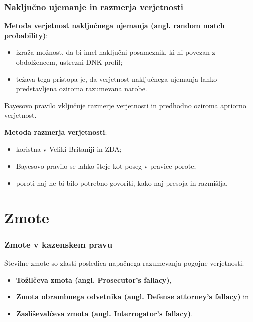 \documentclass{beamer}
\begin{document}
\begin{frame}
  \frametitle{Naključno ujemanje in razmerja verjetnosti}
\textbf{Metoda verjetnost naključnega ujemanja (angl. random match probability)}:
\begin{itemize}
  \item izraža možnost, da bi imel naključni posameznik, ki ni povezan z obdolžencem, ustrezni DNK profil;
  \item težava tega pristopa je, da verjetnost naključnega ujemanja lahko predstavljena oziroma razumevana narobe. \vspace{3mm}
\end{itemize}

Bayesovo pravilo vključuje razmerje verjetnosti in predhodno oziroma apriorno verjetnost. \vspace{3mm}

\textbf{Metoda razmerja verjetnosti}:
\begin{itemize}
  \item koristna v Veliki Britaniji in ZDA;
  \item Bayesovo pravilo se lahko šteje kot poseg v pravice porote;
  \item poroti naj ne bi bilo potrebno govoriti, kako naj presoja in razmišlja.
\end{itemize}
\end{frame}

\section{Zmote}

\begin{frame}
  \frametitle{Zmote v kazenskem pravu}
Številne zmote so zlasti posledica napačnega razumevanja pogojne verjetnosti.
\begin{itemize}
  \item \textbf{Tožilčeva zmota (angl. Prosecutor’s fallacy)},
  \item \textbf{Zmota obrambnega odvetnika (angl. Defense attorney's fallacy)} in 
  \item \textbf{Zasliševalčeva zmota (angl. Interrogator’s fallacy)}. \vspace{3mm}
\end{itemize}
\end{frame}
\end{document}
